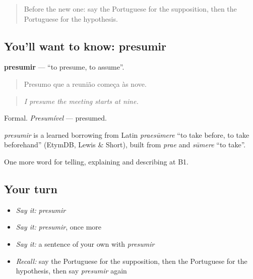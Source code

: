 \label{lesson:PT-C368-presumir}



\begin{quote}
Before the new one: say the Portuguese for the supposition, then the Portuguese for the hypothesis.
\end{quote}

\subsection*{You'll want to know: presumir}
\textbf{presumir} — \textquotedblleft{}to presume, to assume\textquotedblright{}.

\begin{quote}
Presumo que a reunião começa às nove.
\end{quote}

\begin{quote}
\emph{I presume the meeting starts at nine.}
\end{quote}

Formal. \emph{Presumível} — presumed.

\begin{cousinweb}
\emph{presumir} is a learned borrowing from Latin \emph{praesūmere} \textquotedblleft{}to take before, to take beforehand\textquotedblright{} (EtymDB, Lewis \& Short), built from \emph{prae} and \emph{sūmere} \textquotedblleft{}to take\textquotedblright{}.
\end{cousinweb}

\begin{grammarlens}[title={What you've built}]
One more word for telling, explaining and describing at B1.
\end{grammarlens}

\subsection*{Your turn}
\begin{itemize}
\raggedright
  \item \emph{Say it:} \emph{presumir}
  \item \emph{Say it:} \emph{presumir}, once more
  \item \emph{Say it:} a sentence of your own with \emph{presumir}
  \item \emph{Recall:} say the Portuguese for the supposition, then the Portuguese for the hypothesis, then say \emph{presumir} again
\end{itemize}

